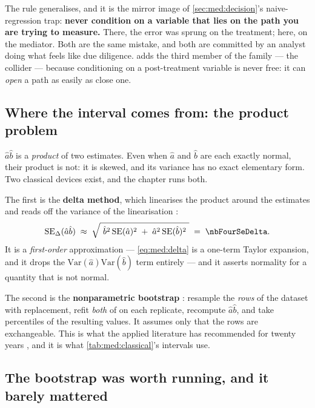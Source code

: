 The rule generalises, and it is the mirror image of \cref{sec:med:decision}'s naive-regression trap:
\textbf{never condition on a variable that lies on the path you are trying to measure.} There, the
error was sprung on the treatment; here, on the mediator. Both are the same mistake, and both are
committed by an analyst doing what feels like due diligence.  adds the third
member of the family --- the collider --- because conditioning on a post-treatment variable is never
free: it can \emph{open} a path as easily as close one.

\subsection*{Where the interval comes from: the product problem}

$\hat a \hat b$ is a \emph{product} of two estimates. Even when $\hat a$ and $\hat b$ are each exactly
normal, their product is not: it is skewed, and its variance has no exact elementary form. Two
classical devices exist, and the chapter runs both.

The first is the \textbf{delta method}, which linearises the product around the estimates and reads
off the variance of the linearisation \citep{sobel1982}:
%
\begin{equation}
  \text{SE}_\Delta(\hat a \hat b) \;\approx\;
  \sqrt{\ \hat b^{2}\,\text{SE}(\hat a)^{2} \;+\; \hat a^{2}\,\text{SE}(\hat b)^{2}\ }
  \;=\; \nbFourSeDelta .
  \label{eq:med:delta}
\end{equation}
%
It is a \emph{first-order} approximation --- \cref{eq:med:delta} is a one-term Taylor expansion, and
it drops the $\text{Var}(\hat a)\text{Var}(\hat b)$ term entirely --- and it asserts normality for a
quantity that is not normal.

The second is the \textbf{nonparametric bootstrap} \citep{efron1979, efron1993}: resample the
\emph{rows} of the dataset with replacement, refit \emph{both} of
 on each replicate, recompute $\hat a\hat b$, and take
percentiles of the resulting \nbFourNBoot{} values. It assumes only that the rows are exchangeable.
This is what the applied literature has recommended for twenty years \citep{preacher2008,
mackinnon2002}, and it is what \cref{tab:med:classical}'s intervals use.



\subsection*{The bootstrap was worth running, and it barely mattered}

